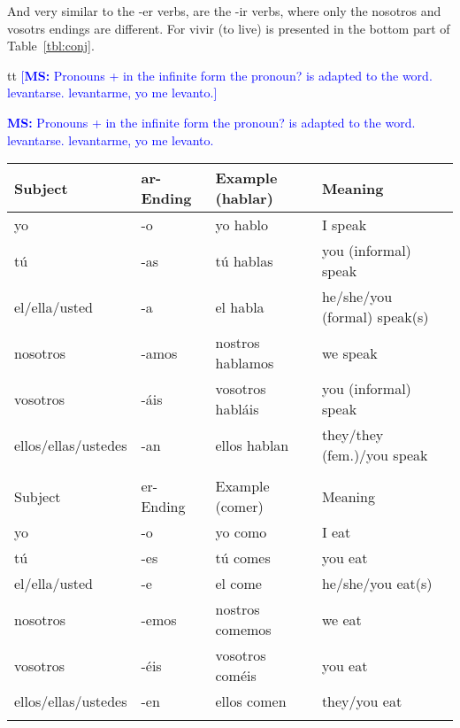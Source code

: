 \documentclass[a4paper,12pt]{article}
\newcommand*{\MS}[2][r]{\ifx t#1 \textcolor{blue}{[\textbf{MS:} #2]}
  \else \begin{center}\textcolor{blue}{\textbf{MS:} #2} \end{center} \fi}
\begin{document}
And very similar to the -er verbs, are the -ir verbs, where only the nosotros and vosotrs endings
are different. For \textsf{vivir} (to live) is presented in the bottom part of Table~\ref{tbl:conj}.


\MS[t]{Pronouns + in the infinite form the pronoun? is adapted to the word. levantarse. levantarme, yo me
  levanto.}

\vfill
\pagebreak

\begin{table}[H]
\centering
\begin{tabular}{llll}
  Subject             & ar-Ending & Example (hablar) & Meaning                      \\
  \toprule
  yo                  & -o        & yo hablo         & I speak                      \\
  tú                  & -as       & tú hablas        & you (informal) speak         \\
  el/ella/usted       & -a        & el habla         & he/she/you (formal) speak(s) \\
  nosotros            & -amos     & nostros hablamos & we speak                     \\
  vosotros            & -áis      & vosotros habláis & you (informal) speak         \\
  ellos/ellas/ustedes & -an       & ellos hablan     & they/they (fem.)/you speak   \\
  \midrule
                      &           &                  &                              \\
  Subject             & er-Ending & Example (comer)  & Meaning                      \\
  \toprule
  yo                  & -o        & yo como          & I eat                        \\
  tú                  & -es       & tú comes         & you eat                      \\
  el/ella/usted       & -e        & el come          & he/she/you eat(s)            \\
  nosotros            & -emos     & nostros comemos  & we eat                       \\
  vosotros            & -éis      & vosotros coméis  & you eat                      \\
  ellos/ellas/ustedes & -en       & ellos comen      & they/you eat                 \\
  \midrule
                      &           &                  &                              \\

\end{tabular}
\end{table}
\end{document}
